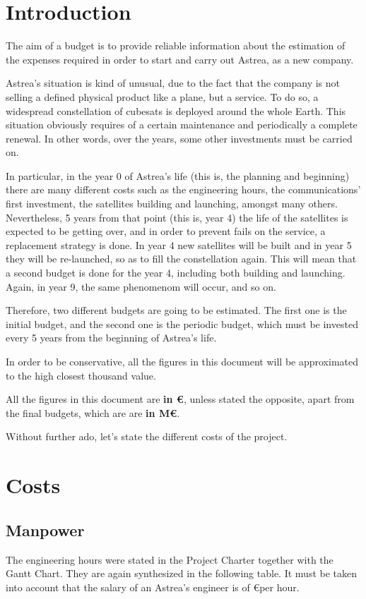 \chapter{Introduction}
The aim of a budget is to provide reliable information about the estimation of the expenses required in order to start and carry out Astrea, as a new company.

Astrea's situation is kind of unusual, due to the fact that the company is not selling a defined physical product like a plane, but a service. To do so, a widespread constellation of cubesats is deployed around the whole Earth. This situation obviously requires of a certain maintenance and periodically a complete renewal. In other words, over the years, some other investments must be carried on. 

In particular, in the year 0 of Astrea's life (this is, the planning and beginning) there are many different costs such as the engineering hours, the communications' first investment, the satellites building and launching, amongst many others. Nevertheless, 5 years from that point (this is, year 4) the life of the satellites is expected to be getting over, and in order to prevent fails on the service, a replacement strategy is done. In year 4 new satellites will be built and in year 5 they will be re-launched, so as to fill the constellation again. This will mean that a second budget is done for the year 4, including both building and launching. Again, in year 9, the same phenomenom will occur, and so on. 

Therefore, two different budgets are going to be estimated. The first one is the initial budget, and the second one is the periodic budget, which must be invested every 5 years from the beginning of Astrea's life.  

In order to be conservative, all the figures in this document will be approximated to the high closest thousand value. 

All the figures in this document are \textbf{in \euro}, unless stated the opposite, apart from the final budgets, which are are \textbf{in M\euro}. 

Without further ado, let's state the different costs of the project.


\chapter{Costs}
\section{Manpower}
The engineering hours were stated in the Project Charter together with the Gantt Chart. They are again synthesized in the following table. It must be taken into account that the salary of an Astrea's engineer is of \euro  per hour. 

